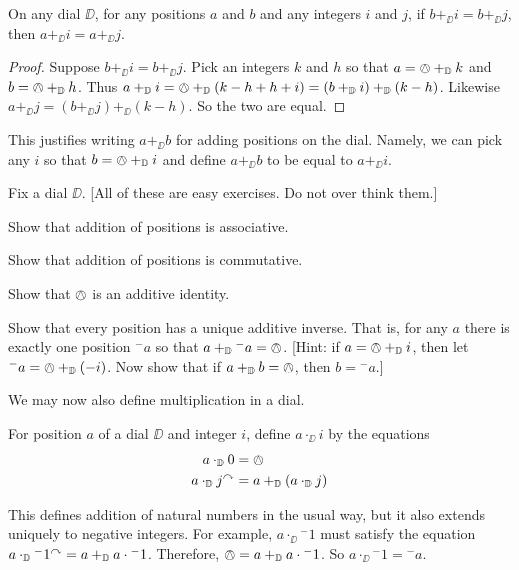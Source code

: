 \begin{lem}
	On any dial $\DD$, for any positions $a$ and $b$ and any integers $i$ and $j$, if $b +_\DD i = b +_\DD j$, then $a +_\DD i = a +_\DD j$.
	\begin{proof} 
Suppose $b +_\DD i = b +_\DD j$.
Pick an integers $k$ and $h$ so that $a = \owedge +_{\mathbb D} k$ and $b = \owedge +_{\mathbb D} h$. Thus $a+_{\mathbb D} i = \owedge +_{\mathbb D}(k-h+h + i) = (b +_{\mathbb D} i) +_{\mathbb D} (k-h)$. Likewise $a+_\DD j = (b +_\DD j) +_\DD(k-h)$. So the two are equal.
\end{proof}
\end{lem}

This justifies writing $a +_\DD b$ for adding positions on the dial. Namely, we can pick any $i$ so that $b = \owedge +_{\mathbb D} i$ and define $a +_\DD b$ to be equal to $a +_\DD i$. 

\begin{exer}
	Fix a dial $\DD$. [All of these are easy exercises. Do not over think them.]
	\begin{exercise}
		\item Show that addition of positions is associative.
		\item Show that addition of positions is commutative.
		\item Show that $\owedge$ is an additive identity.
		\item Show that every position has a unique additive inverse. That is, for any $a$ there is exactly one position ${}^-a$ so that $a +_{\mathbb D} {}^-a = \owedge$. [Hint: if $a = \owedge +_{\mathbb D} i$, then let ${}^-a = \owedge +_{\mathbb D}(-i)$. Now show that if $a +_{\mathbb D} b = \owedge$, then $b = {}^-a$.]
	\end{exercise}
\end{exer}

We may now also define multiplication in a dial.

\begin{defn}
	For position $a$ of a dial $\DD$ and integer $i$, define $a\cdot_\DD i$ by the equations
	\begin{align*}
		a\cdot_{\mathbb D}  0 &= \owedge\\
		a\cdot_{\mathbb D} j^\curvearrowright &= a +_{\mathbb D} (a\cdot_{\mathbb D} j)
	\end{align*}
	
	This defines addition of natural numbers in the usual way, but it also extends uniquely to negative integers. For example, $a \cdot_\DD {}^-1$ must satisfy the equation $a\cdot_{\mathbb D} {}^-1^\curvearrowright = a +_{\mathbb D} a\cdot {}^-1$.
	Therefore, $\owedge = a +_{\mathbb D} a\cdot {}^-1$. So $a\cdot_\DD {}^-1 = {}^- a$.
\end{defn}


